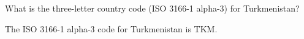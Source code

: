
\begin{question}
What is the three-letter country code (ISO 3166-1 alpha-3) for
Turkmenistan?
\end{question}

\begin{solution}
The ISO 3166-1 alpha-3 code for Turkmenistan is TKM.
\end{solution}

